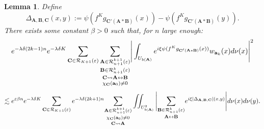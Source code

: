 \documentclass[a4paper]{article}
\newtheorem{lemma}[theorem]{Lemma}
\theoremstyle{definition}
\begin{document}
\begin{lemma}
Define $$ \Delta_{\mathbf{A},\mathbf{B},\mathbf{C}}(x,y) :=  \psi( f^K g_{\mathbf{C}'(\mathbf{A} * \mathbf{B})}(x)) - \psi( f^K g_{\mathbf{C}'(\mathbf{A} * \mathbf{B})}(y)). $$
There exists some constant $\beta>0$ such that, for $n$ large enough:
$$ e^{-\lambda \delta (2k-1) n} e^{- \lambda \delta K} \sum_{\mathbf{C} \in \mathcal{R}_{K+1}(\varepsilon)} \underset{\chi_{\mathbf{C}}(\mathbf{a}_0) \neq 0}{\underset{\mathbf{C} \rightsquigarrow \mathbf{A} \leftrightarrow \mathbf{B}}{ \underset{ \mathbf{B} \in \mathcal{R}_{n+1}^k(\varepsilon)}{ \underset{\mathbf{A} \in \mathcal{R}_{n+1}^{k+1}(\varepsilon) }{ \sum}} }} \Bigg{|} \int_{U_{b(\mathbf{A})}}  e^{i \xi \psi( f^K g_{\mathbf{C}'(\mathbf{A} * \mathbf{B})}(x))} w_{\mathbf{a}_k}(x) d\nu(x) \Bigg{|}^2 $$
$$ \lesssim e^{\varepsilon \beta n } e^{- \lambda \delta K} \sum_{\mathbf{C} \in \mathcal{R}_{K+1}(\varepsilon)}  e^{-\lambda \delta (2k+1) n} \underset{\mathbf{C} \rightsquigarrow \mathbf{A}}{\underset{\chi_\mathbf{C}(\mathbf{a}_0) \neq 0}{\underset{\mathbf{A} \in \mathcal{R}_{n+1}^{k+1}(\varepsilon)}{\sum}} }\iint_{U_{b(\mathbf{A})}^2 }  \Bigg{|} \underset{\mathbf{A} \leftrightarrow \mathbf{B}}{\sum_{\mathbf{B} \in \mathcal{R}_{n+1}^k(\varepsilon)}} e^{i \xi \left|\Delta_{\mathbf{A},\mathbf{B},\mathbf{C}}\right|(x,y) } \Bigg| d\nu(x) d\nu(y)  .$$

\end{lemma}
\end{document}
